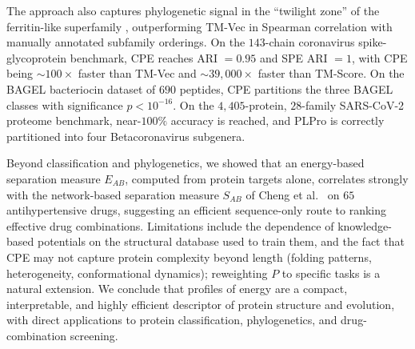 \documentclass[11pt]{article}
\begin{document}
The approach also captures phylogenetic signal in the ``twilight zone'' of the ferritin-like superfamily \cite{lundin2012ferritin,malik2014ferritin,puente2022ferritin}, outperforming TM-Vec in Spearman correlation with manually annotated subfamily orderings. On the $143$-chain coronavirus spike-glycoprotein benchmark, CPE reaches ARI $=0.95$ and SPE ARI $=1$, with CPE being $\sim 100\times$ faster than TM-Vec and $\sim 39{,}000\times$ faster than TM-Score. On the BAGEL bacteriocin dataset of $690$ peptides, CPE partitions the three BAGEL classes with significance $p < 10^{-16}$. On the $4{,}405$-protein, $28$-family SARS-CoV-2 proteome benchmark, near-$100\%$ accuracy is reached, and PLPro is correctly partitioned into four Betacoronavirus subgenera.

Beyond classification and phylogenetics, we showed that an energy-based separation measure $E_{AB}$, computed from protein targets alone, correlates strongly with the network-based separation measure $S_{AB}$ of Cheng et al.~\cite{cheng2019network} on $65$ antihypertensive drugs, suggesting an efficient sequence-only route to ranking effective drug combinations. Limitations include the dependence of knowledge-based potentials on the structural database used to train them, and the fact that CPE may not capture protein complexity beyond length (folding patterns, heterogeneity, conformational dynamics); reweighting $P$ to specific tasks is a natural extension. We conclude that profiles of energy are a compact, interpretable, and highly efficient descriptor of protein structure and evolution, with direct applications to protein classification, phylogenetics, and drug-combination screening.



\end{document}
